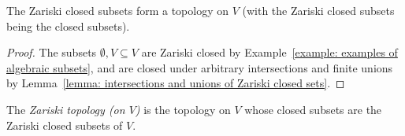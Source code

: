 \begin{corollary}
  The Zariski closed subsets form a topology on $V$ (with the Zariski closed subsets being the closed subsets).
\end{corollary}


\begin{proof}
  The subsets $\emptyset, V \subseteq V$ are Zariski closed by Example~\ref{example: examples of algebraic subsets}, and are closed under arbitrary intersections and finite unions by Lemma~\ref{lemma: intersections and unions of Zariski closed sets}.
\end{proof}


\begin{definition}
  The \emph{Zariski topology \textup(on $V$\textup)} is the topology on $V$ whose closed subsets are the Zariski closed subsets of $V$.
\end{definition}


